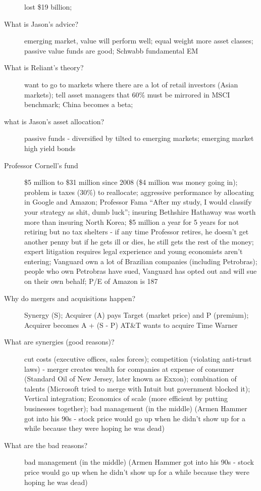 \documentclass[11pt]{article}
\begin{document}
\begin{description}
  lost \$19 billion;
\item[What is Jason's advice?]
  emerging market, value will perform well;
  equal weight more asset classes;
  passive value funds are good;
  Schwabb fundamental EM
\item[What is Reliant's theory?]
  want to go to markets where there are a lot of retail investors (Asian markets);
  tell asset managers that 60\% must be mirrored in MSCI benchmark;
  China becomes a beta;
\item[what is Jason's asset allocation?]
  passive funds - diversified by tilted to emerging markets; emerging market high yield bonds
\item[Professor Cornell's fund]
  \$5 million to \$31 million since 2008 (\$4 million was money going in);
  problem is taxes (30\%) to reallocate;
  aggressive performance by allocating in Google and Amazon;
  Professor Fama ``After my study, I would classify your strategy as shit, dumb luck'';
  insuring Bethshire Hathaway was worth more than insuring North Korea;
  \$5 million a year for 5 years for not retiring but no tax shelters - if any time Professor retires, he doesn't get another penny but if he gets ill or dies, he still gets the rest of the money;
  expert litigation requires legal experience and young economists aren't entering;
  Vanguard own a lot of Brazilian companies (including Petrobras);
  people who own Petrobras have sued, Vanguard has opted out and will sue on their own behalf;
  P/E of Amazon is 187
\item[Why do mergers and acquisitions happen?]
  Synergy (S);
  Acquirer (A) pays Target (market price) and P (premium);
  Acquirer becomes A + (S - P)
  AT\&T wants to acquire Time Warner
\item[What are synergies (good reasons)?]
  cut costs (executive offices, sales forces);
  competition (violating anti-trust laws) - merger creates wealth for companies at expense of consumer (Standard Oil of New Jersey, later known as Exxon);
  combination of talents (Microsoft tried to merge with Intuit but government blocked it);
  Vertical integration;
  Economics of scale (more efficient by putting businesses together);
  bad management (in the middle) (Armen Hammer got into his 90s - stock price would go up when he didn't show up for a while because they were hoping he was dead)
\item[What are the bad reasons?]
  bad management (in the middle) (Armen Hammer got into his 90s - stock price would go up when he didn't show up for a while because they were hoping he was dead)

\end{description}
\end{document}
